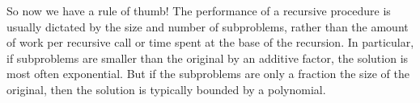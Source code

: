 So now we have a rule of thumb!  The performance of a recursive
procedure is usually dictated by the size and number of subproblems,
rather than the amount of work per recursive call or time spent at the
base of the recursion.  In particular, if subproblems are smaller than
the original by an additive factor, the solution is most often
exponential.   But if the subproblems are only a fraction the size of
the original, then the solution is typically bounded by a polynomial.

\begin{editingnotes}
\end{editingnotes}

\endinput
